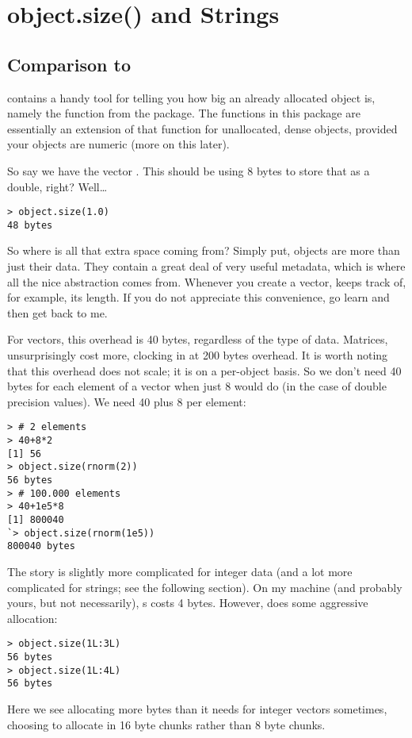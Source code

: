 \section{object.size() and Strings}

\subsection{Comparison to }

 contains a handy tool for telling you how big an already allocated 
object is, namely the  function from the  
package.  The functions in this package are essentially an extension of that 
function for unallocated, dense objects, provided your objects are numeric (more 
on this later).

So say we have the vector .  This should be using 8 bytes to 
store that  as a double, right?  Well\dots
\begin{lstlisting}[language=rr]
> object.size(1.0)
48 bytes
\end{lstlisting}

So where is all that extra space coming from?  Simply put,  objects 
are more than just their data.  They contain a great deal of very useful 
metadata, which is where all the nice abstraction comes from.  Whenever you 
create a vector,  keeps track of, for example, its length.  If you 
do not appreciate this convenience, go learn  and then get back to 
me.  

For vectors, this overhead is 40 bytes, regardless of the type of data.   
Matrices, unsurprisingly cost more, clocking in at 200 bytes overhead.  It is 
worth noting that this overhead does not scale; it is on a per-object basis.  So 
we don't need 40 bytes for each element of a vector when just 8 would do (in the 
case of double precision values).  We need 40 plus 8 per element:
\begin{lstlisting}[language=rr]
> # 2 elements
> 40+8*2
[1] 56
> object.size(rnorm(2))
56 bytes
> # 100.000 elements
> 40+1e5*8
[1] 800040
`> object.size(rnorm(1e5))
800040 bytes
\end{lstlisting}

The story is slightly more complicated for integer data (and a lot more 
complicated for strings; see the following section).  On my machine (and 
probably yours, but not necessarily), s costs 4 bytes.  However, 
 does some aggressive allocation:
\begin{lstlisting}[language=rr]
> object.size(1L:3L)
56 bytes
> object.size(1L:4L)
56 bytes
\end{lstlisting}
Here we see  allocating more bytes than it needs for integer vectors 
sometimes, choosing to allocate in 16 byte chunks rather than 8 byte chunks.

